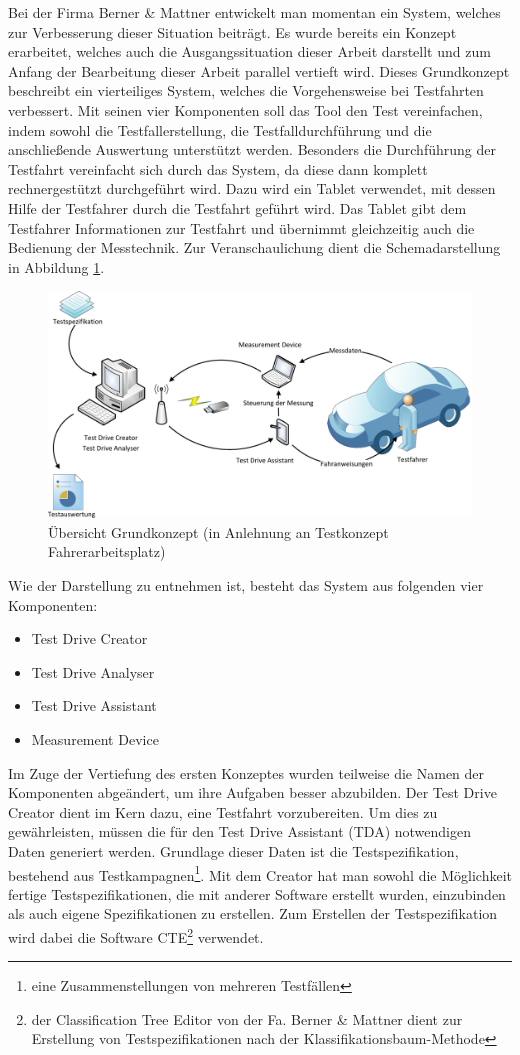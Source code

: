 \documentclass[12pt,a4paper]{report}
\begin{document}
Bei der Firma Berner \& Mattner entwickelt man momentan ein System, welches zur Verbesserung dieser Situation beiträgt. Es wurde bereits ein Konzept erarbeitet, welches auch die Ausgangssituation dieser Arbeit darstellt und zum Anfang der Bearbeitung dieser Arbeit parallel vertieft wird. Dieses Grundkonzept beschreibt ein vierteiliges System, welches die Vorgehensweise bei Testfahrten verbessert. Mit seinen vier Komponenten soll das Tool den Test vereinfachen, indem sowohl die Testfallerstellung, die Testfalldurchführung und die anschließende Auswertung unterstützt werden. Besonders die Durchführung der Testfahrt vereinfacht sich durch das System, da diese dann komplett rechnergestützt durchgeführt wird. Dazu wird ein Tablet verwendet, mit dessen Hilfe der Testfahrer durch die Testfahrt geführt wird. Das Tablet gibt dem Testfahrer Informationen zur Testfahrt und übernimmt gleichzeitig auch die Bedienung der Messtechnik. Zur Veranschaulichung dient die Schemadarstellung in Abbildung \ref{pic:Konzept}.
\begin{figure}
\includegraphics[width=1\linewidth]{Darstellungen/Uebersicht_System}
\caption{Übersicht Grundkonzept (in Anlehnung an Testkonzept Fahrerarbeitsplatz)}\label{pic:Konzept}
\end{figure}
\noindent Wie der Darstellung zu entnehmen ist, besteht das System aus folgenden vier Komponenten:
\begin{itemize}
\item{Test Drive Creator}
\item{Test Drive Analyser}
\item{Test Drive Assistant}
\item{Measurement Device}
\end{itemize}
Im Zuge der Vertiefung des ersten Konzeptes wurden teilweise die Namen der Komponenten abgeändert, um ihre Aufgaben besser abzubilden. Der Test Drive Creator dient im Kern dazu, eine Testfahrt vorzubereiten. Um dies zu gewährleisten, müssen die für den Test Drive Assistant (TDA) notwendigen Daten generiert werden. Grundlage dieser Daten ist die Testspezifikation, bestehend aus Testkampagnen\footnote{eine Zusammenstellungen von mehreren Testfällen}. Mit dem Creator hat man sowohl die Möglichkeit fertige Testspezifikationen, die mit anderer Software erstellt wurden, einzubinden als auch eigene Spezifikationen zu erstellen. Zum Erstellen der Testspezifikation wird dabei die Software CTE\footnote{der Classification Tree Editor von der Fa. Berner \& Mattner dient zur Erstellung von Testspezifikationen nach der Klassifikationsbaum-Methode} verwendet.
\end{document}
